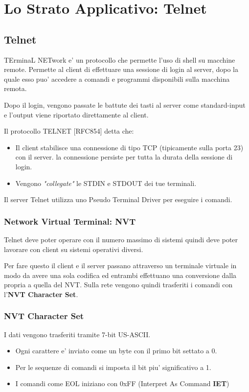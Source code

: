 \chapter{Lo Strato Applicativo: Telnet}
\section{Telnet}
TErminaL NETwork e' un protocollo che permette l'uso di shell su macchine remote.
Permette al client di effettuare una sessione di login al server, dopo la quale esso puo' accedere a comandi e programmi disponibili sulla macchina remota.

Dopo il login, vengono passate le battute dei tasti al server come standard-input e l'output viene riportato direttamente al client.

Il protocollo TELNET [RFC854] detta che:
\begin{itemize}
    \item Il client stabilisce una connessione di tipo TCP (tipicamente sulla porta 23) con il server. la connessione persiste per tutta la durata della sessione di login.
    \item Vengono \textit{"collegate"} le STDIN e STDOUT dei tue terminali.
\end{itemize}
Il server Telnet utilizza uno Pseudo Terminal Driver per eseguire i comandi.
\subsection{Network Virtual Terminal: NVT}
Telnet deve poter operare con il numero massimo di sistemi quindi deve poter lavorare con client su sistemi operativi diversi.

Per fare questo il client e il server passano attraverso un terminale virtuale in modo da avere una sola codifica ed entrambi effettuano una conversione dalla propria a quella del NVT.
Sulla rete vengono quindi trasferiti i comandi con l'\textbf{NVT Character Set}.
\newpage
\subsection{NVT Character Set}
I dati vengono trasferiti tramite 7-bit US-ASCII.
\begin{itemize}
    \item Ogni carattere e' inviato come un byte con il primo bit settato a 0.
    \item Per le sequenze di comandi si imposta il bit piu' significativo a 1.
    \item I comandi come EOL iniziano con 0xFF (Interpret As Command \textbf{IET})
\end{itemize}
